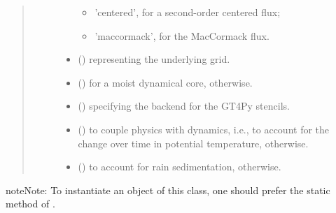 \documentclass[letterpaper,10pt,english]{sphinxmanual}
\begin{document}
\begin{fulllineitems}
\begin{fulllineitems}
\begin{quote}
\begin{description}
\begin{itemize}
\begin{itemize}
\item {} 
’centered’, for a second-order centered flux;

\item {} 
’maccormack’, for the MacCormack flux.

\end{itemize}


\item {} 
 () \textendash{} {\hyperref[\detokenize{api:tasmania.grids.grid_xyz.GridXYZ}]{}} representing the underlying grid.

\item {} 
 () \textendash{}  for a moist dynamical core,  otherwise.

\item {} 
 () \textendash{}  specifying the backend for the GT4Py stencils.

\item {} 
 () \textendash{}  to couple physics with dynamics, i.e., to account for the change over time in potential
temperature,  otherwise.

\item {} 
 () \textendash{}  to account for rain sedimentation,  otherwise.

\end{itemize}

\end{description}\end{quote}

\begin{sphinxadmonition}{note}{Note:}
To instantiate an object of this class, one should prefer the static method
{\hyperref[\detokenize{api:tasmania.dycore.prognostic_isentropic_nonconservative.PrognosticIsentropicNonconservative.factory}]{}} of
{\hyperref[\detokenize{api:tasmania.dycore.prognostic_isentropic_nonconservative.PrognosticIsentropicNonconservative}]{}}.
\end{sphinxadmonition}


\end{fulllineitems}
\end{fulllineitems}
\end{document}
